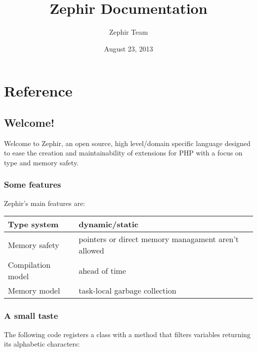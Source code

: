 \documentclass[letterpaper,10pt,english]{sphinxmanual}
\title{Zephir Documentation}
\date{August 23, 2013}
\author{Zephir Team}
\begin{document}
\maketitle
\tableofcontents
{}\label{index::doc}



\chapter{Reference}
\label{index:zephir-language}\label{index:reference}

\section{Welcome!}
\label{welcome:welcome}\label{welcome::doc}
Welcome to Zephir, an open source, high level/domain specific language
designed to ease the creation and maintainability of extensions for PHP
with a focus on type and memory safety.


\subsection{Some features}
\label{welcome:some-features}
Zephir's main features are:

\begin{tabulary}{\linewidth}{|L|L|}
\hline

Type system
 & 
dynamic/static
\\\hline

Memory safety
 & 
pointers or direct memory managament aren't allowed
\\\hline

Compilation model
 & 
ahead of time
\\\hline

Memory model
 & 
task-local garbage collection
\\\hline
\end{tabulary}



\subsection{A small taste}
\label{welcome:a-small-taste}
The following code registers a class with a method that filters variables returning its
alphabetic characters:
\end{document}
